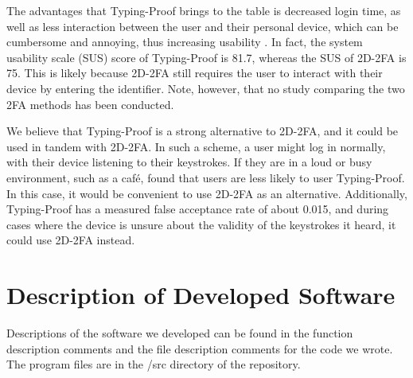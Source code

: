 \documentclass[11pt]{article}
\begin{document}
The advantages that Typing-Proof brings to the table is decreased login
time, as well as less interaction between the user and their personal
device, which can be cumbersome and annoying, thus increasing usability
\cite{liuTypingProof}. In fact, the system usability scale (SUS) score
of Typing-Proof is 81.7, whereas the SUS of 2D-2FA is 75. This is likely
because 2D-2FA still requires the user to interact with their device by
entering the identifier. Note, however, that no study comparing the two
2FA methods has been conducted.  

We believe that Typing-Proof is a strong alternative to 2D-2FA, and it
could be used in tandem with 2D-2FA. In such a scheme, a user might
log in normally, with their device listening to their keystrokes. If
they are in a loud or busy environment, such as a caf\'e,
\cite{liuTypingProof} found that users are less likely to user
Typing-Proof. In this case, it would be convenient to use 2D-2FA as an
alternative. Additionally, Typing-Proof has a measured false acceptance
rate of about 0.015, and during cases where the device is unsure about
the validity of the keystrokes it heard, it could use 2D-2FA instead.





\appendix
\section{Description of Developed Software}

Descriptions of the software we developed can be found in the function
description comments and the file description comments for the code we
wrote. The program files are in the /src directory of the
repository. 
\end{document}
